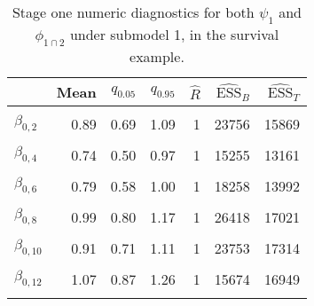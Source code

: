 \begin{table}

\caption{\label{tab:surv-stage-one-submodel-one}Stage one numeric diagnostics for both $\psi_{1}$ and $\phi_{1 \cap 2}$ under submodel 1, in the survival example.}
\centering
\begin{tabular}[t]{lrrrrrr}
\toprule
  & Mean & $q_{0.05}$ & $q_{0.95}$ & $\widehat{R}$ & $\widehat{\text{ESS}}_{B}$ & $\widehat{\text{ESS}}_{T}$\\
\midrule
\cellcolor{gray!6}{$\beta_{0, 1}$} & \cellcolor{gray!6}{0.86} & \cellcolor{gray!6}{0.65} & \cellcolor{gray!6}{1.07} & \cellcolor{gray!6}{1} & \cellcolor{gray!6}{23270} & \cellcolor{gray!6}{15545}\\
$\beta_{0, 2}$ & 0.89 & 0.69 & 1.09 & 1 & 23756 & 15869\\
\cellcolor{gray!6}{$\beta_{0, 3}$} & \cellcolor{gray!6}{0.87} & \cellcolor{gray!6}{0.66} & \cellcolor{gray!6}{1.08} & \cellcolor{gray!6}{1} & \cellcolor{gray!6}{23131} & \cellcolor{gray!6}{14494}\\
$\beta_{0, 4}$ & 0.74 & 0.50 & 0.97 & 1 & 15255 & 13161\\
\cellcolor{gray!6}{$\beta_{0, 5}$} & \cellcolor{gray!6}{0.92} & \cellcolor{gray!6}{0.71} & \cellcolor{gray!6}{1.14} & \cellcolor{gray!6}{1} & \cellcolor{gray!6}{24378} & \cellcolor{gray!6}{16381}\\
$\beta_{0, 6}$ & 0.79 & 0.58 & 1.00 & 1 & 18258 & 13992\\
\cellcolor{gray!6}{$\beta_{0, 7}$} & \cellcolor{gray!6}{0.69} & \cellcolor{gray!6}{0.43} & \cellcolor{gray!6}{0.93} & \cellcolor{gray!6}{1} & \cellcolor{gray!6}{10261} & \cellcolor{gray!6}{9161}\\
$\beta_{0, 8}$ & 0.99 & 0.80 & 1.17 & 1 & 26418 & 17021\\
\cellcolor{gray!6}{$\beta_{0, 9}$} & \cellcolor{gray!6}{0.91} & \cellcolor{gray!6}{0.64} & \cellcolor{gray!6}{1.19} & \cellcolor{gray!6}{1} & \cellcolor{gray!6}{19675} & \cellcolor{gray!6}{13075}\\
$\beta_{0, 10}$ & 0.91 & 0.71 & 1.11 & 1 & 23753 & 17314\\
\cellcolor{gray!6}{$\beta_{0, 11}$} & \cellcolor{gray!6}{0.68} & \cellcolor{gray!6}{0.49} & \cellcolor{gray!6}{0.86} & \cellcolor{gray!6}{1} & \cellcolor{gray!6}{13534} & \cellcolor{gray!6}{14412}\\
$\beta_{0, 12}$ & 1.07 & 0.87 & 1.26 & 1 & 15674 & 16949\\
\cellcolor{gray!6}{$\beta_{0, 13}$} & \cellcolor{gray!6}{0.90} & \cellcolor{gray!6}{0.64} & \cellcolor{gray!6}{1.17} & \cellcolor{gray!6}{1} & \cellcolor{gray!6}{19876} & \cellcolor{gray!6}{13934}\\

\end{tabular}
\end{table}
